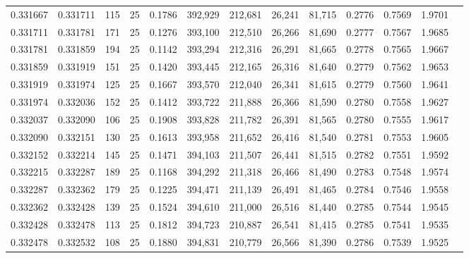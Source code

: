 \begin{tabular}{rrrrrrrrrrrrr}
0.331667 & 0.331711 &   115 &  25 &                                     0.1786 & 392,929 & 212,681 &  26,241 &  81,715 & 0.2776 & 0.7569 & 1.9701 \\
0.331711 & 0.331781 &   171 &  25 &                                     0.1276 & 393,100 & 212,510 &  26,266 &  81,690 & 0.2777 & 0.7567 & 1.9685 \\
0.331781 & 0.331859 &   194 &  25 &                                     0.1142 & 393,294 & 212,316 &  26,291 &  81,665 & 0.2778 & 0.7565 & 1.9667 \\
0.331859 & 0.331919 &   151 &  25 &                                     0.1420 & 393,445 & 212,165 &  26,316 &  81,640 & 0.2779 & 0.7562 & 1.9653 \\
0.331919 & 0.331974 &   125 &  25 &                                     0.1667 & 393,570 & 212,040 &  26,341 &  81,615 & 0.2779 & 0.7560 & 1.9641 \\
0.331974 & 0.332036 &   152 &  25 &                                     0.1412 & 393,722 & 211,888 &  26,366 &  81,590 & 0.2780 & 0.7558 & 1.9627 \\
0.332037 & 0.332090 &   106 &  25 &                                     0.1908 & 393,828 & 211,782 &  26,391 &  81,565 & 0.2780 & 0.7555 & 1.9617 \\
0.332090 & 0.332151 &   130 &  25 &                                     0.1613 & 393,958 & 211,652 &  26,416 &  81,540 & 0.2781 & 0.7553 & 1.9605 \\
0.332152 & 0.332214 &   145 &  25 &                                     0.1471 & 394,103 & 211,507 &  26,441 &  81,515 & 0.2782 & 0.7551 & 1.9592 \\
0.332215 & 0.332287 &   189 &  25 &                                     0.1168 & 394,292 & 211,318 &  26,466 &  81,490 & 0.2783 & 0.7548 & 1.9574 \\
0.332287 & 0.332362 &   179 &  25 &                                     0.1225 & 394,471 & 211,139 &  26,491 &  81,465 & 0.2784 & 0.7546 & 1.9558 \\
0.332362 & 0.332428 &   139 &  25 &                                     0.1524 & 394,610 & 211,000 &  26,516 &  81,440 & 0.2785 & 0.7544 & 1.9545 \\
0.332428 & 0.332478 &   113 &  25 &                                     0.1812 & 394,723 & 210,887 &  26,541 &  81,415 & 0.2785 & 0.7541 & 1.9535 \\
0.332478 & 0.332532 &   108 &  25 &                                     0.1880 & 394,831 & 210,779 &  26,566 &  81,390 & 0.2786 & 0.7539 & 1.9525 \\

\end{tabular}
